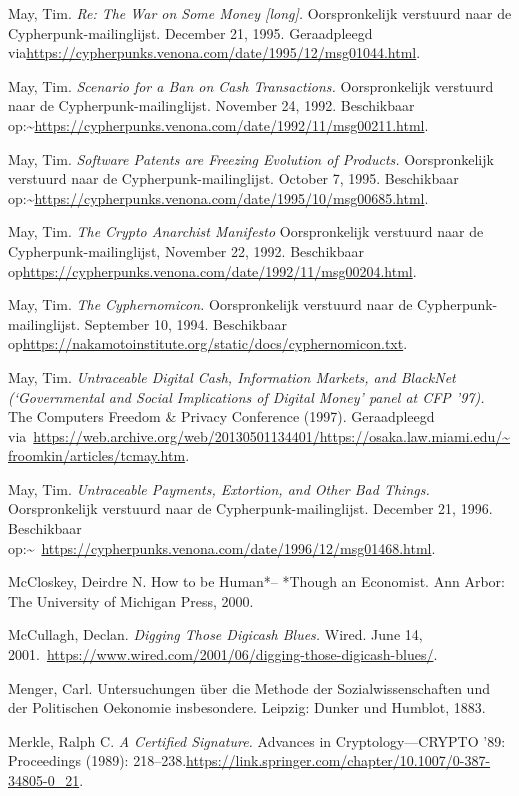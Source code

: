 \documentclass[smalldemyvopaper,11pt,twoside,onecolumn,openright,extrafontsizes,hidelinks]{memoir}
\begin{document}
May, Tim. \emph{Re: The War on Some Money {[}long{]}.} Oorspronkelijk
verstuurd naar de Cypherpunk-mailinglijst. December 21, 1995.
Geraadpleegd
via\url{https://cypherpunks.venona.com/date/1995/12/msg01044.html}.

May, Tim. \emph{Scenario for a Ban on Cash Transactions.} Oorspronkelijk
verstuurd naar de Cypherpunk-mailinglijst. November 24, 1992.
Beschikbaar
op:\textasciitilde{}\url{https://cypherpunks.venona.com/date/1992/11/msg00211.html}.

May, Tim. \emph{Software Patents are Freezing Evolution of Products.}
Oorspronkelijk verstuurd naar de Cypherpunk-mailinglijst. October 7,
1995. Beschikbaar
op:\textasciitilde{}\url{https://cypherpunks.venona.com/date/1995/10/msg00685.html}.

May, Tim. \emph{The Crypto Anarchist Manifesto} Oorspronkelijk verstuurd
naar de Cypherpunk-mailinglijst, November 22, 1992. Beschikbaar
op\url{https://cypherpunks.venona.com/date/1992/11/msg00204.html}.

May, Tim. \emph{The Cyphernomicon.} Oorspronkelijk verstuurd naar de
Cypherpunk-mailinglijst. September 10, 1994. Beschikbaar
op\url{https://nakamotoinstitute.org/static/docs/cyphernomicon.txt}.

May, Tim. \emph{Untraceable Digital Cash, Information Markets, and
BlackNet (`Governmental and Social Implications of Digital Money' panel
at CFP '97).} The Computers Freedom \& Privacy Conference (1997).
Geraadpleegd
via~\href{https://web.archive.org/web/20130501134401/https:/osaka.law.miami.edu/~froomkin/articles/tcmay.htm}{https://web.archive.org/web/20130501134401/https://osaka.law.miami.edu/\textasciitilde froomkin/articles/tcmay.htm}.

May, Tim. \emph{Untraceable Payments, Extortion, and Other Bad Things.}
Oorspronkelijk verstuurd naar de Cypherpunk-mailinglijst. December 21,
1996. Beschikbaar
op:\textasciitilde~\url{https://cypherpunks.venona.com/date/1996/12/msg01468.html}.

McCloskey, Deirdre N. How to be Human*-- *Though an Economist. Ann
Arbor: The University of Michigan Press, 2000.

McCullagh, Declan. \emph{Digging Those Digicash Blues.} Wired. June 14,
2001.~\url{https://www.wired.com/2001/06/digging-those-digicash-blues/}.

Menger, Carl. Untersuchungen über die Methode der Sozialwissenschaften
und der Politischen Oekonomie insbesondere. Leipzig: Dunker und Humblot,
1883.

Merkle, Ralph C. \emph{A Certified Signature.} Advances in
Cryptology---CRYPTO '89: Proceedings (1989):
218--238.\url{https://link.springer.com/chapter/10.1007/0-387-34805-0_21}.
\end{document}

